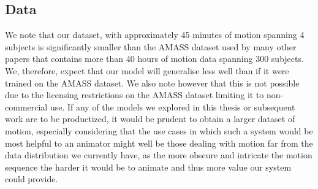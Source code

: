 \subsection{Data}
We note that our dataset, with approximately 45 minutes of motion spanning 4 subjects is significantly smaller than the AMASS \cite{amass} dataset used by many other papers that contains more than 40 hours of motion data spanning 300 subjects. We, therefore, expect that our model will generalise less well than if it were trained on the AMASS dataset. We also note however that this is not possible due to the licensing restrictions on the AMASS dataset limiting it to non-commercial use. If any of the models we explored in this thesis or subsequent work are to be productized, it would be prudent to obtain a larger dataset of motion, especially considering that the use cases in which such a system would be most helpful to an animator might well be those dealing with motion far from the data distribution we currently have, as the more obscure and intricate the motion sequence the harder it would be to animate and thus more value our system could provide.